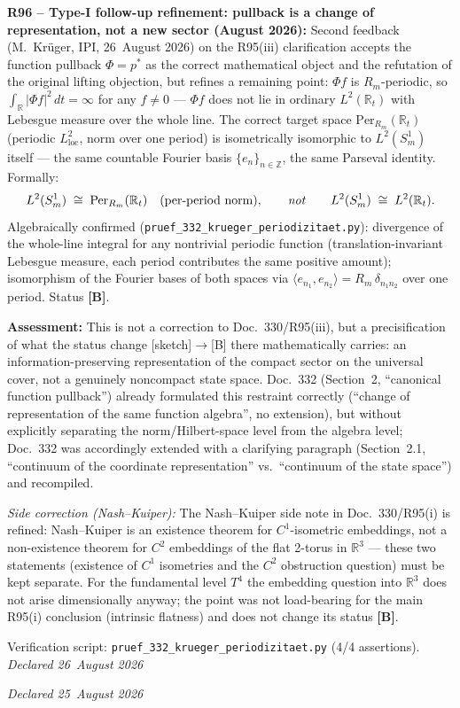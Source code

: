 \textbf{R96 -- Type-I follow-up refinement: pullback is a change of representation, not a new sector (August 2026):}
Second feedback (M.~Krüger, IPI, 26~August 2026) on the R95(iii)
clarification accepts the function pullback $\Phi=p^*$ as the correct
mathematical object and the refutation of the original lifting
objection, but refines a remaining point: $\Phi f$ is $R_m$-periodic,
so $\int_{\mathbb{R}} |\Phi f|^2\,dt = \infty$ for any $f\neq0$ ---
$\Phi f$ does not lie in ordinary $L^2(\mathbb{R}_t)$ with Lebesgue
measure over the whole line. The correct target space
$\mathrm{Per}_{R_m}(\mathbb{R}_t)$ (periodic $L^2_\mathrm{loc}$, norm
over one period) is isometrically isomorphic to $L^2(S^1_m)$ itself ---
the same countable Fourier basis $\{e_n\}_{n\in\mathbb{Z}}$, the same
Parseval identity. Formally:
\[
L^2(S^1_m) \;\cong\; \mathrm{Per}_{R_m}(\mathbb{R}_t)
\quad\text{(per-period norm)},
\qquad\text{\emph{not}}\qquad
L^2(S^1_m) \;\cong\; L^2(\mathbb{R}_t).
\]
Algebraically confirmed (\texttt{pruef\_332\_krueger\_periodizitaet.py}):
divergence of the whole-line integral for any nontrivial periodic
function (translation-invariant Lebesgue measure, each period
contributes the same positive amount); isomorphism of the Fourier bases
of both spaces via $\langle e_{n_1},e_{n_2}\rangle=R_m\,\delta_{n_1 n_2}$
over one period. Status \textbf{[B]}.

\textbf{Assessment:} This is not a correction to Doc.~330/R95(iii), but
a precisification of what the status change [sketch]$\to$[B] there
mathematically carries: an information-preserving representation of the
compact sector on the universal cover, not a genuinely noncompact state
space. Doc.~332 (Section~2, ``canonical function pullback'') already
formulated this restraint correctly (``change of representation of the
same function algebra'', no extension), but without explicitly
separating the norm/Hilbert-space level from the algebra level; Doc.~332
was accordingly extended with a clarifying paragraph (Section~2.1,
``continuum of the coordinate representation'' vs.\ ``continuum of the
state space'') and recompiled.

\emph{Side correction (Nash--Kuiper):} The Nash--Kuiper side note in
Doc.~330/R95(i) is refined: Nash--Kuiper is an existence theorem for
$C^1$-isometric embeddings, not a non-existence theorem for $C^2$
embeddings of the flat 2-torus in $\mathbb{R}^3$ --- these two statements
(existence of $C^1$ isometries and the $C^2$ obstruction question) must
be kept separate. For the fundamental level $T^4$ the embedding question
into $\mathbb{R}^3$ does not arise dimensionally anyway; the point was
not load-bearing for the main R95(i) conclusion (intrinsic flatness) and
does not change its status \textbf{[B]}.

Verification script: \texttt{pruef\_332\_krueger\_periodizitaet.py} (4/4 assertions).\\
\emph{Declared 26~August 2026}

\medskip
\emph{Declared 25~August 2026}

\medskip
